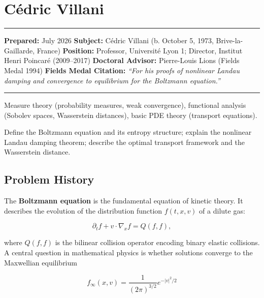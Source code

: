 \chapter{Cédric Villani}\label{ch2010cedricvillani:cuxe9dric-villani-fields-medal-2010-a-comprehensive-report-on-his-work-and-impact}

\begin{center}\rule{0.5\linewidth}{0.5pt}\end{center}

\textbf{Prepared:} July 2026 \textbf{Subject:} Cédric Villani (b. October 5, 1973, Brive-la-Gaillarde, France) \textbf{Position:} Professor, Université Lyon 1; Director, Institut Henri Poincaré (2009--2017) \textbf{Doctoral Advisor:} Pierre-Louis Lions (Fields Medal 1994) \textbf{Fields Medal Citation:} \emph{``For his proofs of nonlinear Landau damping and convergence to equilibrium for the Boltzmann equation.''}

\begin{center}\rule{0.5\linewidth}{0.5pt}\end{center}

\begin{prereqs} Measure theory (probability measures, weak convergence), functional analysis (Sobolev spaces, Wasserstein distances), basic PDE theory (transport equations). \end{prereqs}

\begin{objectives} Define the Boltzmann equation and its entropy structure; explain the nonlinear Landau damping theorem; describe the optimal transport framework and the Wasserstein distance. \end{objectives}

\section{Problem History}\label{ch2010cedricvillani:problem-history}

The \textbf{Boltzmann equation} is the fundamental equation of kinetic theory. It describes the evolution of the distribution function $f(t,x,v)$ of a dilute gas:

\[
\partial_t f + v \cdot \nabla_x f = Q(f,f),
\]

where $Q(f,f)$ is the bilinear collision operator encoding binary elastic collisions. A central question in mathematical physics is whether solutions converge to the Maxwellian equilibrium

\[
f_\infty(x,v) = \frac{1}{(2\pi)^{3/2}} e^{-|v|^2/2}
\]


